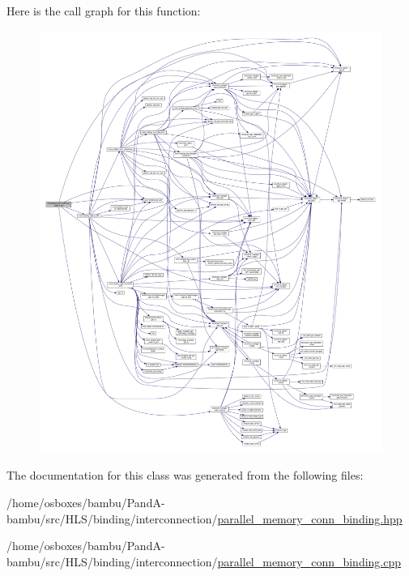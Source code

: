 Here is the call graph for this function\+:
\nopagebreak
\begin{figure}[H]
\begin{center}
\leavevmode
\includegraphics[width=350pt]{d0/dd5/classParallelMemoryConnBinding_a269ef0bbe0925ec814787b9d3b5a54bf_cgraph}
\end{center}
\end{figure}


The documentation for this class was generated from the following files\+:\begin{DoxyCompactItemize}
\item 
/home/osboxes/bambu/\+Pand\+A-\/bambu/src/\+H\+L\+S/binding/interconnection/\hyperlink{parallel__memory__conn__binding_8hpp}{parallel\+\_\+memory\+\_\+conn\+\_\+binding.\+hpp}\item 
/home/osboxes/bambu/\+Pand\+A-\/bambu/src/\+H\+L\+S/binding/interconnection/\hyperlink{parallel__memory__conn__binding_8cpp}{parallel\+\_\+memory\+\_\+conn\+\_\+binding.\+cpp}\end{DoxyCompactItemize}
